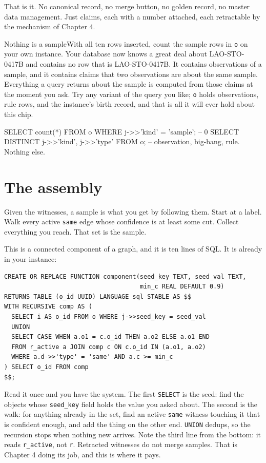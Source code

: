 That is it. No canonical record, no merge button, no golden record, no master data management. Just claims, each with a number attached, each retractable by the mechanism of Chapter 4.

\begin{Correspondence}{Nothing is a sample}{With all ten rows inserted, count the sample rows in \texttt{o} on your own instance.}
Your database now knows a great deal about LAO-STO-0417B and contains no row that is LAO-STO-0417B. It contains observations of a sample, and it contains claims that two observations are about the same sample. Everything a query returns about the sample is computed from those claims at the moment you ask. Try any variant of the query you like; \texttt{o} holds observations, rule rows, and the instance's birth record, and that is all it will ever hold about this chip.
\begin{Check}
SELECT count(*) FROM o WHERE j->>'kind' = 'sample';   -- 0
SELECT DISTINCT j->>'kind', j->>'type' FROM o;        -- observation, big-bang, rule. Nothing else.
\end{Check}
\end{Correspondence}

\section{The assembly}

Given the witnesses, a sample is what you get by following them. Start at a label. Walk every active \texttt{same} edge whose confidence is at least some cut. Collect everything you reach. That set is the sample.

This is a connected component of a graph, and it is ten lines of SQL. It is already in your instance:

\begin{lstlisting}
CREATE OR REPLACE FUNCTION component(seed_key TEXT, seed_val TEXT,
                                     min_c REAL DEFAULT 0.9)
RETURNS TABLE (o_id UUID) LANGUAGE sql STABLE AS $$
WITH RECURSIVE comp AS (
  SELECT i AS o_id FROM o WHERE j->>seed_key = seed_val
  UNION
  SELECT CASE WHEN a.o1 = c.o_id THEN a.o2 ELSE a.o1 END
  FROM r_active a JOIN comp c ON c.o_id IN (a.o1, a.o2)
  WHERE a.d->>'type' = 'same' AND a.c >= min_c
) SELECT o_id FROM comp
$$;
\end{lstlisting}

Read it once and you have the system. The first \texttt{SELECT} is the seed: find the objects whose \texttt{seed\_key} field holds the value you asked about. The second is the walk: for anything already in the set, find an active \texttt{same} witness touching it that is confident enough, and add the thing on the other end. \texttt{UNION} dedups, so the recursion stops when nothing new arrives. Note the third line from the bottom: it reads \texttt{r\_active}, not \texttt{r}. Retracted witnesses do not merge samples. That is Chapter 4 doing its job, and this is where it pays.

